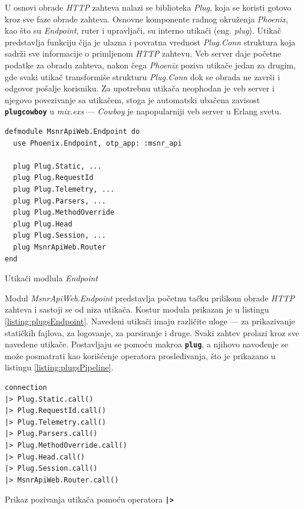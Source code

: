 \documentclass[12pt,oneside]{memoir}
\begin{document}
U osnovi obrade \emph{HTTP} zahteva nalazi se biblioteka \emph{Plug}, koja se koristi gotovo kroz sve faze obrade zahteva.
Osnovne komponente radnog okruženja \emph{Phoenix}, kao što su \emph{Endpoint}, ruter i upravljači, su interno utikači (eng. \emph{plug}).
Utikač predstavlja funkciju čija je ulazna i povratna vrednost \emph{Plug.Conn} struktura koja sadrži sve informacije o
primljenom \emph{HTTP} zahtevu. Veb server daje početne podatke za obradu zahteva, nakon čega \emph{Phoenix} poziva utikače jedan za drugim,
gde svaki utikač transformiše strukturu \emph{Plug.Conn} dok se obrada ne završi i odgovor pošalje korisniku. Za upotrebnu utikača neophodan je
veb server i njegovo povezivanje sa utikačem, stoga je automatski ubačena zavisost \texttt{\textbf{plug{\textunderscore}cowboy}} u \emph{mix.exs}
--- \emph{Cowboy} je napopularniji veb server u Erlang svetu.

\begin{listing}[!ht]
\begin{verbatim}
defmodule MsnrApiWeb.Endpoint do
  use Phoenix.Endpoint, otp_app: :msnr_api

  plug Plug.Static, ...
  plug Plug.RequestId
  plug Plug.Telemetry, ...
  plug Plug.Parsers, ...
  plug Plug.MethodOverride
  plug Plug.Head
  plug Plug.Session, ...
  plug MsnrApiWeb.Router
end
\end{verbatim}
\caption{Utikači modlula \emph{Endpoint}}
\label{listing:plugsEndpoint}
\end{listing}
Modul \emph{MsnrApiWeb.Endpoint} predstavlja početnu tačku prilikom obrade \emph{HTTP} zahteva i sastoji se od niza utikača. Kostur
modula prikazan je u listingu \ref{listing:plugsEndpoint}. Navedeni utikači imaju različite uloge --- za prikazivanje statičkih fajlova, za logovanje,
za parsiranje i druge. Svaki zahtev prolazi kroz sve navedene utikače. Postavljaju se pomoću makroa \texttt{\textbf{plug}}, a njihovo
navođenje se može posmatrati kao korišćenje operatora prosleđivanja, što je prikazano u listingu \ref{listing:plugsPipeline}.
\begin{listing}[!h]
\begin{verbatim}
connection
|> Plug.Static.call()
|> Plug.RequestId.call()
|> Plug.Telemetry.call()
|> Plug.Parsers.call()
|> Plug.MethodOverride.call()
|> Plug.Head.call()
|> Plug.Session.call()
|> MsnrApiWeb.Router.call()
\end{verbatim}
\caption{Prikaz pozivanja utikača pomoću operatora \texttt{\textbf{|>}}}
\label{listing:plugsPipeline}
\end{listing}
\end{document}
